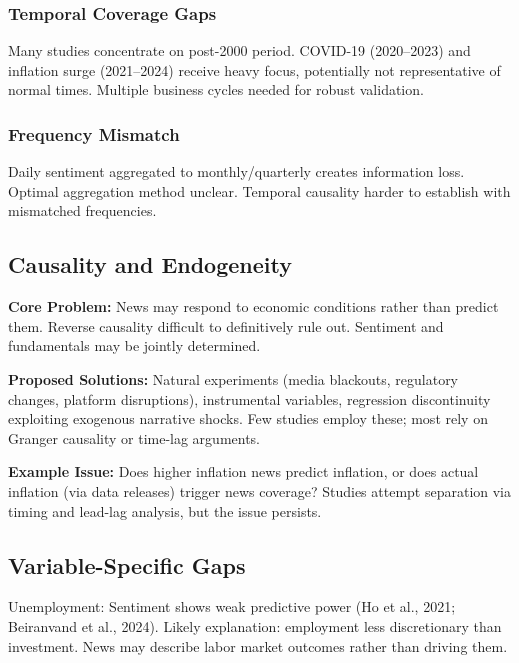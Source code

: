 \documentclass[12pt,a4paper]{article}
\begin{document}
\subsubsection{Temporal Coverage Gaps}

Many studies concentrate on post-2000 period. COVID-19 (2020--2023) and inflation surge (2021--2024) receive heavy focus, potentially not representative of normal times. Multiple business cycles needed for robust validation.

\subsubsection{Frequency Mismatch}

Daily sentiment aggregated to monthly/quarterly creates information loss. Optimal aggregation method unclear. Temporal causality harder to establish with mismatched frequencies.

\subsection{Causality and Endogeneity}
\label{subsec:limitations_causality}

\textbf{Core Problem:} News may respond to economic conditions rather than predict them. Reverse causality difficult to definitively rule out. Sentiment and fundamentals may be jointly determined.

\textbf{Proposed Solutions:} Natural experiments (media blackouts, regulatory changes, platform disruptions), instrumental variables, regression discontinuity exploiting exogenous narrative shocks. Few studies employ these; most rely on Granger causality or time-lag arguments.

\textbf{Example Issue:} Does higher inflation news predict inflation, or does actual inflation (via data releases) trigger news coverage? Studies attempt separation via timing and lead-lag analysis, but the issue persists.

\subsection{Variable-Specific Gaps}
\label{subsec:limitations_unemployment}

Unemployment: Sentiment shows weak predictive power (Ho et al., 2021; Beiranvand et al., 2024). Likely explanation: employment less discretionary than investment. News may describe labor market outcomes rather than driving them.
\end{document}
